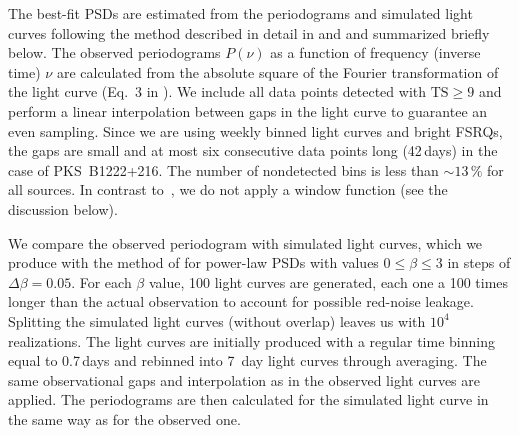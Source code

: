 \documentclass[twocolumn]{aastex62}
\begin{document}
The best-fit PSDs are estimated from the periodograms and simulated light curves following the method described in detail in \citet{2014MNRAS.445..437M} and \citet{2013MNRAS.433..907E} and summarized briefly below.
The observed periodograms $P(\nu)$ as a function of frequency (inverse time) $\nu$ are calculated from the absolute square of the Fourier transformation of the light curve (Eq.~3 in \citealt{2014MNRAS.445..437M}). 
We include all data points detected with $\mathrm{TS} \geqslant 9$ and perform a linear interpolation between gaps in the light curve to guarantee an even sampling. 
Since we are using weekly binned light curves and bright FSRQs, the gaps are small and at most six consecutive data points long (42\,days) in the case of PKS~B1222+216. The number of nondetected bins is less than $\sim13\,\%$ for all sources.
In contrast to~\citet{2014MNRAS.445..437M}, we do not apply a window function (see the discussion below). 

We compare the observed periodogram with simulated light curves, which we produce with the method of \citet{1995A&A...300..707T} for power-law PSDs with values $0 \leqslant \beta \leqslant 3$ in steps of $\Delta\beta = 0.05$. For each $\beta$ value, 100 light curves are generated, each one a 100 times longer than the actual observation to account for possible red-noise leakage. Splitting the simulated light curves (without overlap) leaves us with $10^4$ realizations. 
The light curves are initially produced with a regular time binning equal to 0.7\,days and  rebinned into 7~day light curves through averaging. 
The same observational gaps and interpolation as in the observed light curves are applied. 
The periodograms are then calculated for the simulated light curve in the same way as for the observed one.
\end{document}

